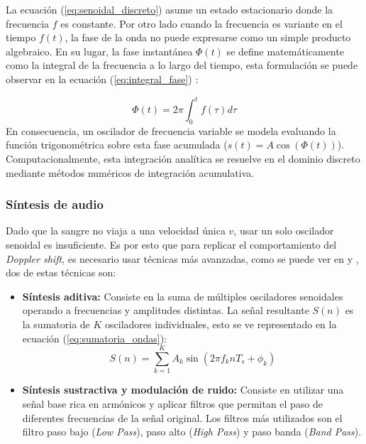 La ecuación (\ref{eq:senoidal_discreto}) asume un estado estacionario donde la frecuencia $f$ es constante. Por otro lado cuando la frecuencia es variante en el tiempo $f(t)$, la fase de la onda no puede expresarse como un simple producto algebraico. En su lugar, la fase instantánea $\Phi(t)$ se define matemáticamente como la integral de la frecuencia a lo largo del tiempo, esta formulación se puede observar en la ecuación (\ref{eq:integral_fase}) \cite{boashash1992estimating}:

\begin{equation}
    \Phi(t) = 2\pi \int_{0}^{t} f(\tau) d\tau
    \label{eq:integral_fase}
\end{equation}
En consecuencia, un oscilador de frecuencia variable se modela evaluando la función trigonométrica sobre esta fase acumulada ($s(t) = A \cos(\Phi(t))$). Computacionalmente, esta integración analítica se resuelve en el dominio discreto mediante métodos numéricos de integración acumulativa.

\subsubsection{Síntesis de audio}

Dado que la sangre no viaja a una velocidad única $v$, usar un solo oscilador senoidal es insuficiente. Es por esto que para replicar el comportamiento del \textit{Doppler shift}, es necesario usar técnicas más avanzadas, como se puede ver en \cite{dePoli1983} y \cite{Moorer1977}, dos de estas técnicas son:

\begin{itemize}
    \item \textbf{Síntesis aditiva:} Consiste en la suma de múltiples osciladores senoidales operando a frecuencias y amplitudes distintas. La señal resultante $S(n)$ es la sumatoria de $K$ osciladores individuales, esto se ve representado en la ecuación (\ref{eq:sumatoria_ondas}):
    \begin{equation}    
        S(n) = \sum_{k=1}^{K} A_k \sin(2\pi f_k n T_s + \phi_k) 
        \label{eq:sumatoria_ondas}
    \end{equation}
    \item \textbf{Síntesis sustractiva y modulación de ruido:} Consiste en utilizar una señal base rica en armónicos y aplicar filtros que permitan el paso de diferentes frecuencias de la señal original. Los filtros más utilizados son el filtro paso bajo (\textit{Low Pass}), paso alto (\textit{High Pass}) y paso banda (\textit{Band Pass}).
\end{itemize}

